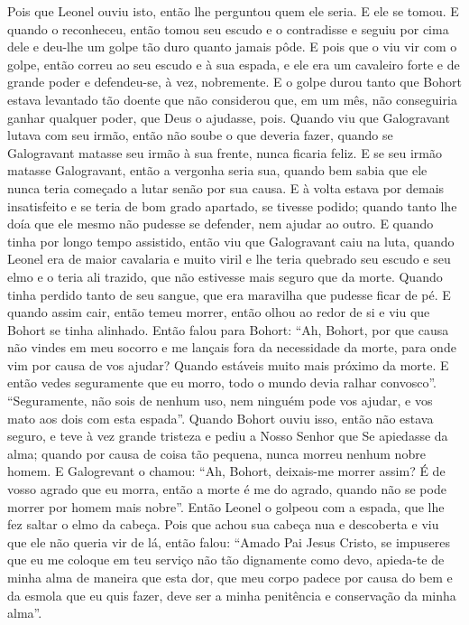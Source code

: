 Pois que Leonel ouviu isto, então lhe perguntou quem ele seria. E ele se tomou.
E quando o reconheceu, então tomou seu escudo e o contradisse e seguiu por cima
dele e deu-lhe um golpe tão duro quanto jamais pôde. E pois que o viu vir com o
golpe, então correu ao seu escudo e à sua espada, e ele era um cavaleiro forte
e de grande poder e defendeu-se, à vez, nobremente. E o golpe durou tanto que
Bohort estava levantado tão doente que não considerou que, em um mês, não
conseguiria ganhar qualquer poder, que Deus o ajudasse, pois. Quando viu que
Galogravant lutava com seu irmão, então não soube o que deveria fazer, quando
se Galogravant matasse seu irmão à sua frente, nunca ficaria feliz. E se seu
irmão matasse Galogravant, então a vergonha seria sua, quando bem sabia que ele
nunca teria começado a lutar senão por sua causa. E à volta estava por demais
insatisfeito e se teria de bom grado apartado, se tivesse podido; quando tanto
lhe doía que ele mesmo não pudesse se defender, nem ajudar ao outro. E quando
tinha por longo tempo assistido, então viu que Galogravant caiu na luta, quando
Leonel era de maior cavalaria e muito viril e lhe teria quebrado seu escudo e
seu elmo e o teria ali trazido, que não estivesse mais seguro que da morte.
Quando tinha perdido tanto de seu sangue, que era maravilha que pudesse ficar
de pé. E quando assim cair, então temeu morrer, então olhou ao redor de si e
viu que Bohort se tinha alinhado. Então falou para Bohort: “Ah, Bohort, por que
causa não vindes em meu socorro e me lançais fora da necessidade da morte, para
onde vim por causa de vos ajudar? Quando estáveis muito mais próximo da morte.
E então vedes seguramente que eu morro, todo o mundo devia ralhar convosco”.
“Seguramente, não sois de nenhum uso, nem ninguém pode vos ajudar, e vos mato
aos dois com esta espada”. Quando Bohort ouviu isso, então não estava seguro, e
teve à vez grande tristeza e pediu a Nosso Senhor que Se apiedasse da alma;
quando por causa de coisa tão pequena, nunca morreu nenhum nobre homem. E
Galogrevant o chamou: “Ah, Bohort, deixais-me morrer assim? É de vosso agrado
que eu morra, então a morte é me do agrado, quando não se pode morrer por homem
mais nobre”. Então Leonel o golpeou com a espada, que lhe fez saltar o
elmo da cabeça. Pois que achou sua cabeça nua e descoberta e viu que ele não
queria vir de lá, então falou: “Amado Pai Jesus Cristo, se impuseres que eu me
coloque em teu serviço não tão dignamente como devo, apieda-te de minha alma de
maneira que esta dor, que meu corpo padece por causa do bem e da esmola que eu
quis fazer, deve ser a minha penitência e conservação da minha alma”.

